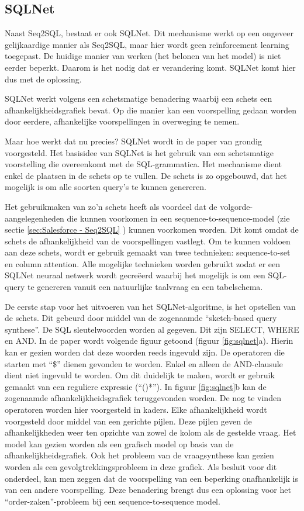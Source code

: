 \subsection{SQLNet}
\label{sec:SQLNet}

Naast Seq2SQL, bestaat er ook SQLNet. Dit mechanisme werkt op een ongeveer gelijkaardige manier als Seq2SQL, maar hier wordt geen reïnforcement learning toegepast. De huidige manier van werken (het belonen van het model) is niet eerder beperkt. Daarom is het nodig dat er verandering komt. SQLNet komt hier dus met de oplossing.

SQLNet werkt volgens een schetsmatige benadering waarbij een schets een afhankelijkheidsgrafiek bevat. Op die manier kan een voorspelling gedaan worden door eerdere, afhankelijke voorspellingen in overweging te nemen. 

Maar hoe werkt dat nu precies? SQLNet wordt in de paper van \textcite{sqlnetPaper} grondig voorgesteld. Het basisidee van SQLNet is het gebruik van een schetsmatige voorstelling die overeenkomt met de SQL-grammatica. Het mechanisme dient enkel de plaatsen in de schets op te vullen. De schets is zo opgebouwd, dat het mogelijk is om alle soorten query’s te kunnen genereren.

Het gebruikmaken van zo’n schets heeft als voordeel dat de volgorde-aangelegenheden die kunnen voorkomen in een sequence-to-sequence-model (zie  sectie \ref{sec:Salesforce - Seq2SQL} ) kunnen voorkomen worden. Dit komt omdat de schets de afhankelijkheid van de voorspellingen vastlegt. Om te kunnen voldoen aan deze schets, wordt er gebruik gemaakt van twee technieken: sequence-to-set en column attention. Alle mogelijke technieken worden gebruikt zodat er een SQLNet neuraal netwerk wordt gecreëerd waarbij het mogelijk is om een SQL-query te genereren vanuit een natuurlijke taalvraag en een tabelschema.

De eerste stap voor het uitvoeren van het SQLNet-algoritme, is het opstellen van de schets. Dit gebeurd door middel van de zogenaamde “sketch-based query synthese”. De SQL sleutelwoorden worden al gegeven. Dit zijn SELECT, WHERE en AND. In de paper wordt volgende figuur getoond (figuur \ref{fig:sqlnet}a). Hierin kan er gezien worden dat deze woorden reeds ingevuld zijn. De operatoren die starten met “\$” dienen gevonden te worden. Enkel en alleen de AND-clausule dient niet ingevuld te worden. Om dit duidelijk te maken, wordt er gebruik gemaakt van een reguliere expressie (“()*”). In figuur \ref{fig:sqlnet}b kan de zogenaamde afhankelijkheidsgrafiek teruggevonden worden. De nog te vinden operatoren worden hier voorgesteld in kaders. Elke afhankelijkheid wordt voorgesteld door middel van een gerichte pijlen. Deze pijlen geven de afhankelijkheden weer ten opzichte van zowel de kolom als de gestelde vraag. Het model kan gezien worden als een grafisch model op basis van de afhankelijkheidsgrafiek. Ook het probleem van de vraagsynthese kan gezien worden als een gevolgtrekkingsprobleem in deze grafiek. Als besluit voor dit onderdeel, kan men zeggen dat de voorspelling van een beperking onafhankelijk is van een andere voorspelling. Deze benadering brengt dus een oplossing voor het “order-zaken”-probleem bij een sequence-to-sequence model.

